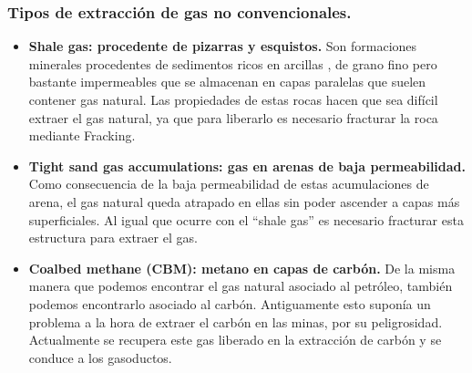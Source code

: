 		\subsubsection{Tipos de extracción de gas no convencionales.}
			\begin{itemize}
				\item \textbf{Shale gas: procedente de pizarras y esquistos.}
					Son formaciones minerales procedentes de sedimentos ricos en arcillas , de grano fino pero bastante impermeables que se almacenan en capas paralelas que suelen contener gas natural. Las propiedades de estas rocas hacen que sea difícil extraer el gas natural, ya que para liberarlo es necesario fracturar la roca mediante Fracking.
				\item \textbf{Tight sand gas accumulations: gas en arenas de baja permeabilidad.}
					Como consecuencia de la baja permeabilidad de estas acumulaciones de arena, el gas natural queda atrapado en ellas sin poder ascender a capas más superficiales. Al igual que ocurre con el “shale gas” es necesario fracturar esta estructura para extraer el gas.
				\item \textbf{Coalbed methane (CBM): metano en capas de carbón.}
					De la misma manera que podemos encontrar el gas natural asociado al petróleo, también podemos encontrarlo asociado al carbón. Antiguamente esto suponía un problema a la hora de extraer el carbón en las minas, por su peligrosidad. Actualmente se recupera este gas liberado en la extracción de carbón y se conduce a los gasoductos.
			\end{itemize}
			
